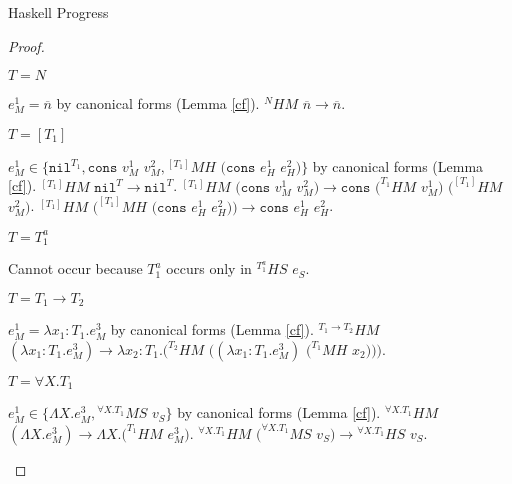 \begin{theorem}{Haskell Progress}
\begin{proof}
\begin{case}
\begin{subcase}
$T=N$

$e_{M}^{1}=\overline{n}$ by canonical forms (Lemma \ref{cf}).  $^{N}HM$ $\overline{n}\rightarrow\overline{n}$.

\end{subcase}

\begin{subcase}

$T=[T_{1}]$

$e_{M}^{1}\in\lbrace\mathtt{nil}^{T_{1}},\mathtt{cons}$ $v_{M}^{1}$ $v_{M}^{2},{^{[T_{1}]}M}H$ $(\mathtt{cons}$ $e_{H}^{1}$ $e_{H}^{2})\rbrace$ by canonical forms (Lemma \ref{cf}).  $^{[T_{1}]}HM$ $\mathtt{nil}^{T}\rightarrow\mathtt{nil}^{T}$.  $^{[T_{1}]}HM$ $(\mathtt{cons}$ $v_{M}^{1}$ $v_{M}^{2})\rightarrow\mathtt{cons}$ $(^{T_{1}}HM$ $v_{M}^{1})$ $(^{[T_{1}]}HM$ $v_{M}^{2})$.  $^{[T_{1}]}HM$ $(^{[T_{1}]}MH$ $(\mathtt{cons}$ $e_{H}^{1}$ $e_{H}^{2}))\rightarrow\mathtt{cons}$ $e_{H}^{1}$ $e_{H}^{2}$.

\end{subcase}

\begin{subcase}

$T=T_{1}^{a}$

Cannot occur because $T_{1}^{a}$ occurs only in $^{T_{1}^{a}}HS$ $e_{S}$.

\end{subcase}

\begin{subcase}

$T=T_{1}\rightarrow T_{2}$

$e_{M}^{1}=\lambda x_{1}:T_{1}.e_{M}^{3}$ by canonical forms (Lemma \ref{cf}).  $^{T_{1}\rightarrow T_{2}}HM$ $(\lambda x_{1}:T_{1}.e_{M}^{3})\rightarrow\lambda x_{2}:T_{1}.(^{T_{2}}HM$ $((\lambda x_{1}:T_{1}.e_{M}^{3})$ $(^{T_{1}}MH$ $x_{2})))$.

\end{subcase}

\begin{subcase}

$T=\forall X.T_{1}$

$e_{M}^{1}\in\lbrace\Lambda X.e_{M}^{3},{^{\forall X.T_{1}}M}S$ $v_{S}\rbrace$ by canonical forms (Lemma \ref{cf}).  $^{\forall X.T_{1}}HM$ $(\Lambda X.e_{M}^{3})\rightarrow\Lambda X.(^{T_{1}}HM$ $e_{M}^{3})$.  $^{\forall X.T_{1}}HM$ $(^{\forall X.T_{1}}MS$ $v_{S})\rightarrow{^{\forall X.T_{1}}H}S$ $v_{S}$.

\end{subcase}


\end{case}
\end{proof}
\end{theorem}
